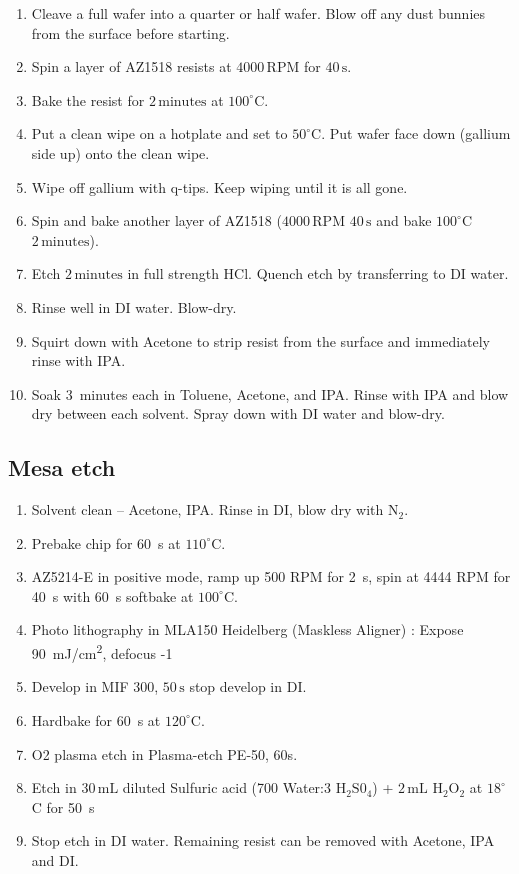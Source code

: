 \begin{enumerate}
\item Cleave a full wafer into a quarter or half wafer. Blow off any dust bunnies from the surface before starting.
\item Spin a layer of AZ1518 resists at $4000 \,\mathrm{RPM}$ for $40\,\mathrm{s}$.
\item Bake the resist for $2\,\mathrm{minutes}$ at $100^\circ$C.
\item Put a clean wipe on a hotplate and set to $50^\circ$C. Put wafer face down (gallium side up) onto the clean wipe.
\item Wipe off gallium with q-tips. Keep wiping until it is all gone.
\item Spin and bake another layer of AZ1518 ($4000 \,\mathrm{RPM}$ $40\,\mathrm{s}$ and bake $100^\circ$C $2\,\mathrm{minutes}$).
\item Etch $2 \,\mathrm{minutes}$ in full strength HCl. Quench etch by transferring to DI water.
\item Rinse well in DI water. Blow-dry.
\item Squirt down with Acetone to strip resist from the surface and immediately rinse with IPA.
\item Soak 3~minutes each in Toluene, Acetone, and IPA. Rinse with IPA and blow dry between each solvent. Spray down with DI water and blow-dry.
\end{enumerate}

\subsection{Mesa etch}
\begin{enumerate}
\item Solvent clean – Acetone, IPA. Rinse in DI, blow dry with $\mathrm{N_2}$.
\item Prebake chip for \qty{60}{s} at $110^\circ$C.
\item AZ5214-E  in positive mode, ramp up 500 RPM  for \qty{2}{s}, spin at 4444 RPM for \qty{40}{s} with \qty{60}{s} softbake at $100^\circ$C.
\item Photo lithography in MLA150 Heidelberg (Maskless Aligner) : Expose \qty{90}{mJ/cm^2}, defocus -1 
\item Develop in MIF 300, $50\,\mathrm{s}$ stop develop in DI.
\item Hardbake for \qty{60}{s} at $120^\circ$C.
\item O2 plasma etch in Plasma-etch PE-50, 60s.
\item Etch in $30\,\mathrm{mL}$ diluted Sulfuric acid (700 Water:3 $\mathrm{H_2S0_4}$) + $2 \,\mathrm{mL}$ $\mathrm{H_2O_2}$ at $18^\circ$C for \qty{50}{s}
\item Stop etch in DI water. Remaining resist can be removed with Acetone, IPA and DI.
\end{enumerate}




